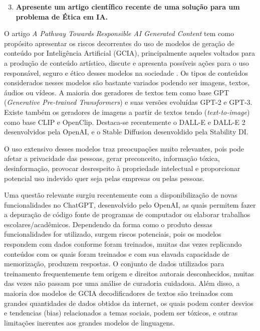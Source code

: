 \begin{enumerate}\setcounter{enumi}{2}\bfseries
    \item  \textbf{Apresente um artigo científico recente de uma solução para um problema de Ética em IA.}
\end{enumerate}

O artigo \textit{A Pathway Towards Responsible AI Generated Content} tem como propósito apresentar 
os riscos decorrentes do uso de modelos de geração de conteúdo por Inteligência Artificial (GCIA), 
principalmente aqueles voltados para a produção de conteúdo artístico,
discute e apresenta possíveis ações para o uso responsável, seguro e ético desses modelos na 
sociedade \cite{chen2023pathway}.
Os tipos de conteúdos considerados nesses modelos são bastante variados podendo ser imagens, textos, 
áudios ou vídeos. A maioria dos geradores de textos tem como base GPT
(\textit{Generative Pre-trained Transformers}) e suas versões evoluídas GPT-2 e GPT-3. 
Existe também os geradores de imagens a partir de textos tendo (\textit{text-to-image}) 
como base CLIP e OpenClip. Destaca-se 
recentemente o DALL-E e DALL-E 2 desenvolvidos pela OpenAI, e o Stable Diffusion desenvoldido pela 
Stability DI.

O uso extensivo desses modelos traz preocupações muito relevantes, pois pode afetar a privacidade das pessoas, 
gerar preconceito, informação tóxica, desinformação, provocar desrespeito à propriedade intelectual e 
proporcionar potencial uso indevido quer seja pelas empresas ou pelas pessoas. 

Uma questão relevante surgiu recentemente com a disponibilização de novas funcionalidades no ChatGPT, desenvolvido 
pelo OpenAI, as quais permitem fazer a depuração de código fonte de programas de 
computador ou elaborar trabalhos escolares/acadêmicos. Dependendo da forma como o produto dessas funcionalidades 
for utilizado, surgem riscos potenciais, pois os modelos respondem com dados conforme foram treinados, muitas das 
vezes replicando conteúdos com os quais foram treinados e com sua elavada capacidade de memorização, produzem respostas.
O conjunto de dados utilizados para treinamento frequentemente tem origem e direitos autorais desconhecidos,
muitas das vezes não passam por uma análise de curadoria cuidadosa. 
Além disso, a maioria dos modelos de GCIA decodificadores de textos são treinados com grandes quantidades 
de dados obtidos da internet, os quais podem conter desvios e tendencias (bias) relacionados a temas sociais, podem ser tóxicos, 
e outras limitações inerentes aos grandes modelos de linguagens.

